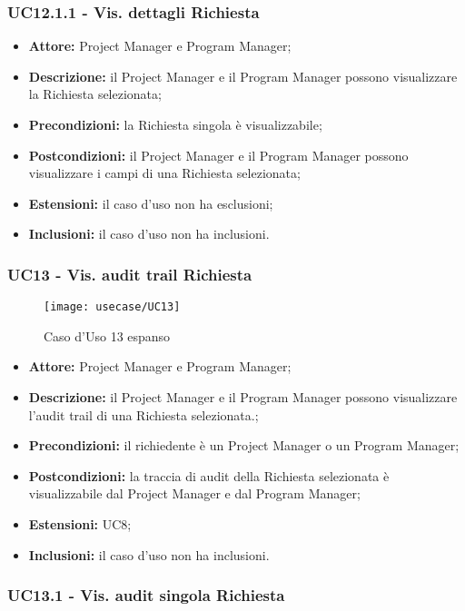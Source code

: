 \subsubsection*{UC12.1.1 - Vis. dettagli Richiesta}

\begin{itemize}[label=$\circ$]
\item \textbf{Attore:} Project Manager e Program Manager;
\item \textbf{Descrizione:} il Project Manager e il Program Manager possono visualizzare la Richiesta selezionata;
\item \textbf{Precondizioni:} la Richiesta singola è visualizzabile;
\item \textbf{Postcondizioni:} il Project Manager e il Program Manager possono visualizzare i campi di una Richiesta selezionata;
\item \textbf{Estensioni:} il caso d'uso non ha esclusioni;
\item \textbf{Inclusioni:} il caso d'uso non ha inclusioni.
\end{itemize}

\subsubsection*{UC13 - Vis. audit trail Richiesta}

\begin{figure}[H] 
    \centering 
    \texttt{[image: usecase/UC13]} 
    \caption{Caso d'Uso 13 espanso}
\end{figure}

\begin{itemize}[label=$\circ$]
\item \textbf{Attore:} Project Manager e Program Manager;
\item \textbf{Descrizione:} il Project Manager e il Program Manager possono visualizzare l'audit trail di una Richiesta selezionata.;
\item \textbf{Precondizioni:} il richiedente è un Project Manager o un Program Manager;
\item \textbf{Postcondizioni:} la traccia di audit della Richiesta selezionata è visualizzabile dal Project Manager e dal Program Manager;
\item \textbf{Estensioni:} UC8;
\item \textbf{Inclusioni:} il caso d'uso non ha inclusioni.
\end{itemize}

\subsubsection*{UC13.1 - Vis. audit singola Richiesta}

